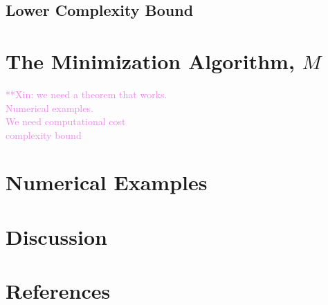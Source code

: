 \documentclass[review]{elsarticle}
\theoremstyle{definition}
\newcommand{\xinnote}[1]{ {\textcolor{violet}  {\mbox{**Xin:} #1}}}
\begin{document}
\subsection{Lower Complexity Bound}



\section{The Minimization Algorithm, $M$}

\xinnote{
we need a theorem that works.\\
Numerical examples.\\
We need computational cost\\
complexity bound
}

\section{Numerical Examples}



\section{Discussion}


\section*{References}


\end{document}
